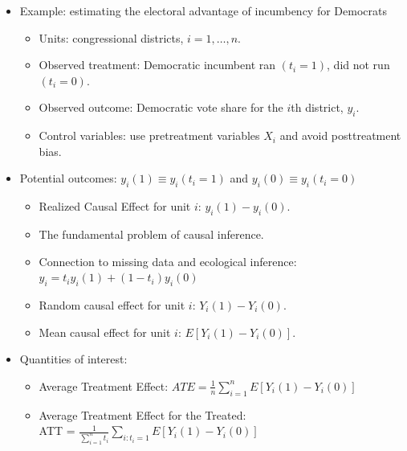 \documentclass[20pt,landscape,pdftex]{foils}
\begin{document}


\hypersetup{pdfpagetransition=Replace}

\begin{itemize}

\item Example: estimating the electoral advantage of incumbency for
  Democrats\pause
  \begin{itemize}
  \item Units: congressional districts, $i=1,\dots,n$.\pause
  \item Observed treatment: Democratic incumbent ran $(t_i=1)$, did
    not run $(t_i=0)$.\pause
  \item Observed outcome: Democratic vote share for the $i$th
    district, $y_i$.\pause
  \item Control variables: use pretreatment variables $X_i$ and avoid
    posttreatment bias.
  \end{itemize}

\item Potential outcomes: $y_i(1) \equiv y_i(t_i=1)$ and $y_i(0)
  \equiv y_i(t_i=0)$\pause  
  \begin{itemize}
  \item Realized Causal Effect for unit $i$: $y_i(1) - y_i(0)$.\pause
  \item The fundamental problem of causal inference.\pause
  \item Connection to missing data and ecological inference:\\ $y_i =
    t_i y_i(1) + (1-t_i) y_i(0)$\pause
  \item Random causal effect for unit $i$: $Y_i(1) - Y_i(0).$\pause
  \item Mean causal effect for unit $i$: $E[Y_i(1) - Y_i(0)].$\pause
  \end{itemize}

\item Quantities of interest:\pause
  \begin{itemize}
    \item Average Treatment Effect: $ATE = \frac{1}{n}\sum_{i=1}^n
      E[Y_i(1) - Y_i(0)]$\pause 
      \bigskip
    \item Average Treatment Effect for the Treated:\\ ATT =
      $\frac{1}{\sum_{i=1}^n t_i}\sum_{i:t_i=1} E[Y_i(1) -
      Y_i(0)]$\pause 
  \end{itemize}
\end{itemize}
\end{document}
